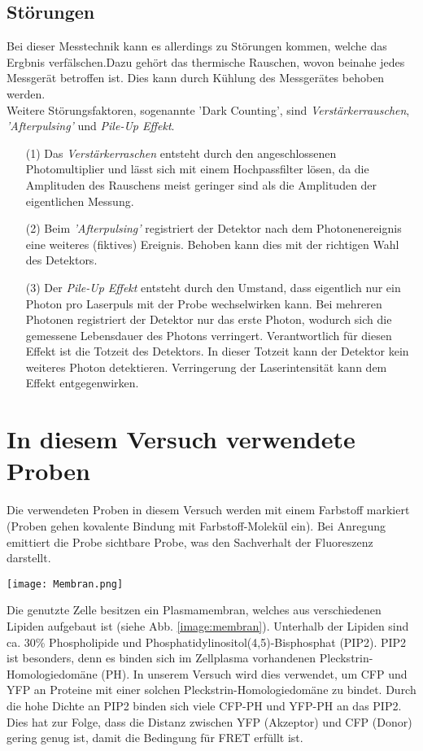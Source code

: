 \subsection*{Störungen}
Bei dieser Messtechnik kann es allerdings zu Störungen kommen, welche das Ergbnis verfälschen.Dazu gehört das thermische Rauschen, wovon beinahe jedes Messgerät betroffen ist. Dies kann durch Kühlung des Messgerätes behoben werden.\\Weitere Störungsfaktoren, sogenannte ’Dark Counting’, sind \textit{Verstärkerrauschen}, \textit{'Afterpulsing'} und \textit{Pile-Up Effekt}.
\begin{itemize}
    \item[(1)] Das \textit{Verstärkerraschen} entsteht durch den angeschlossenen Photomultiplier und lässt sich mit einem Hochpassfilter lösen, da die Amplituden des Rauschens meist geringer sind als die Amplituden der eigentlichen Messung.
    \item[(2)] Beim \textit{'Afterpulsing'} registriert der Detektor nach dem Photonenereignis eine weiteres (fiktives) Ereignis. Behoben kann dies mit der richtigen Wahl des Detektors.
    \item[(3)] Der \textit{Pile-Up Effekt} entsteht durch den Umstand, dass eigentlich nur ein Photon pro Laserpuls mit der Probe wechselwirken kann. Bei mehreren Photonen registriert der Detektor nur das erste Photon, wodurch sich die gemessene Lebensdauer des Photons verringert. Verantwortlich für diesen Effekt ist die Totzeit des Detektors. In dieser Totzeit kann der Detektor kein weiteres Photon detektieren. Verringerung der Laserintensität kann dem Effekt entgegenwirken. \citep{Time}
\end{itemize} 
\newpage
\section{In diesem Versuch verwendete Proben}
\label{sec:proben}
Die verwendeten Proben in diesem Versuch werden mit einem Farbstoff markiert (Proben gehen kovalente Bindung mit Farbstoff-Molekül ein). Bei Anregung emittiert die Probe sichtbare Probe, was den Sachverhalt der Fluoreszenz darstellt.
\begin{center}
    \texttt{[image: Membran.png]}
    \label{image:membran}
\end{center}
Die genutzte Zelle besitzen ein Plasmamembran, welches aus verschiedenen Lipiden aufgebaut ist (siehe Abb. \ref{image:membran}). Unterhalb der Lipiden sind ca. 30\% Phospholipide und Phosphatidylinositol(4,5)-Bisphosphat (PIP2). PIP2 ist besonders, denn es binden sich im Zellplasma vorhandenen Pleckstrin-Homologiedomäne (PH). In unserem Versuch wird dies verwendet, um CFP und YFP an Proteine mit einer solchen Pleckstrin-Homologiedomäne zu bindet. Durch die hohe Dichte an PIP2 binden sich viele CFP-PH und YFP-PH an das PIP2. Dies hat zur Folge, dass die Distanz zwischen YFP (Akzeptor) und CFP (Donor) gering genug ist, damit die Bedingung für FRET erfüllt ist.
